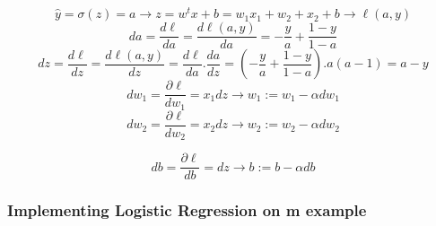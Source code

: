 \begin{equation}\label{eq:logistic_regression_derivatives_single_example}
    \boxed{\widehat{y} = \sigma(z) = a} \longrightarrow  \boxed{ z = w^tx + b = w_1x_1+ w_2+x_2+ b} \longrightarrow \boxed{\ell(a,y)}
  \end{equation}
  \begin{equation}\label{eq:logistic_regression_derivatives_da}
      \boxed{da =  \frac{d\ell}{da} = \frac{d\ell(a,y)}{da} = - \frac{y}{a} + \frac{1-y}{1-a}}
  \end{equation}
    \begin{equation}\label{eq:logistic_regression_derivatives_dz}
    \boxed{dz = \frac{d\ell}{dz} =  \frac{d\ell(a,y)}{dz} =  \frac{d\ell}{da} .  \frac{da}{dz}} = \boxed{(- \frac{y}{a} + \frac{1-y}{1-a}) . a(a-1) } = \boxed{ a - y    }
  \end{equation}
 \begin{equation}\label{eq:logistic_regression_derivatives_dw1}
      \boxed{dw_1 = \frac{\partial\ell}{dw_1} = x_1 dz} \longrightarrow \boxed{ w_1 := w_1 - \alpha dw_1}
  \end{equation}
    \begin{equation}\label{eq:logistic_regression_derivatives_dw2}
    \boxed{dw_2 = \frac{\partial\ell}{dw_2} = x_2 dz} \longrightarrow \boxed{ w_2 := w_2  - \alpha dw_2}
  \end{equation}


  \begin{equation}\label{eq:logistic_regression_derivatives_db}
    \boxed{db = \frac{\partial\ell}{db} =  dz} \longrightarrow \boxed{ b := b - \alpha db}
\end{equation}


 \subsubsection{Implementing Logistic Regression on m example}

